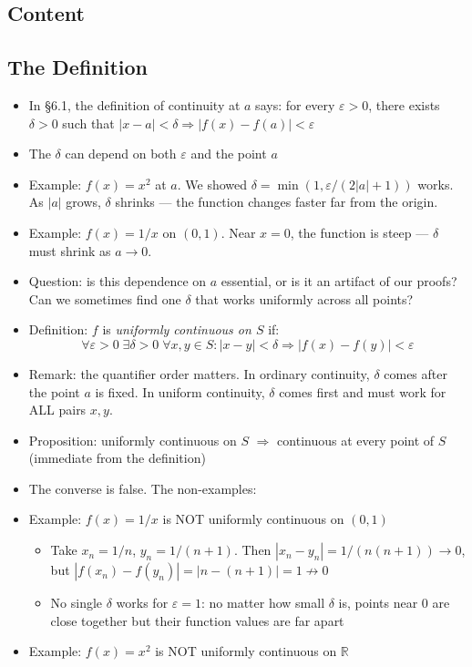 \documentclass[
  10pt,
  letterpaper,
]{scrbook}
\providecommand{\tightlist}{%
  \setlength{\itemsep}{0pt}\setlength{\parskip}{0pt}}
\newcommand{\RR}{\mathbb{R}}
\begin{document}
\subsection{Content}\label{content-28}

\subsection{The Definition}\label{the-definition-2}

\begin{itemize}
\tightlist
\item
  In §6.1, the definition of continuity at \(a\) says: for every
  \(\varepsilon > 0\), there exists \(\delta > 0\) such that
  \(|x - a| < \delta \Rightarrow |f(x) - f(a)| < \varepsilon\)
\item
  The \(\delta\) can depend on both \(\varepsilon\) and the point \(a\)
\item
  Example: \(f(x) = x^2\) at \(a\). We showed
  \(\delta = \min(1, \varepsilon/(2|a|+1))\) works. As \(|a|\) grows,
  \(\delta\) shrinks --- the function changes faster far from the
  origin.
\item
  Example: \(f(x) = 1/x\) on \((0,1)\). Near \(x = 0\), the function is
  steep --- \(\delta\) must shrink as \(a \to 0\).
\item
  Question: is this dependence on \(a\) essential, or is it an artifact
  of our proofs? Can we sometimes find one \(\delta\) that works
  uniformly across all points?
\item
  Definition: \(f\) is \emph{uniformly continuous on \(S\)} if:
  \[\forall \varepsilon > 0 \; \exists \delta > 0 \; \forall x, y \in S: |x - y| < \delta \Rightarrow |f(x) - f(y)| < \varepsilon\]
\item
  Remark: the quantifier order matters. In ordinary continuity,
  \(\delta\) comes after the point \(a\) is fixed. In uniform
  continuity, \(\delta\) comes first and must work for ALL pairs
  \(x, y\).
\item
  Proposition: uniformly continuous on \(S\) \(\Rightarrow\) continuous
  at every point of \(S\) (immediate from the definition)
\item
  The converse is false. The non-examples:
\item
  Example: \(f(x) = 1/x\) is NOT uniformly continuous on \((0,1)\)

  \begin{itemize}
  \tightlist
  \item
    Take \(x_n = 1/n\), \(y_n = 1/(n+1)\). Then
    \(|x_n - y_n| = 1/(n(n+1)) \to 0\), but
    \(|f(x_n) - f(y_n)| = |n - (n+1)| = 1 \not\to 0\)
  \item
    No single \(\delta\) works for \(\varepsilon = 1\): no matter how
    small \(\delta\) is, points near \(0\) are close together but their
    function values are far apart
  \end{itemize}
\item
  Example: \(f(x) = x^2\) is NOT uniformly continuous on \(\RR\)


\end{itemize}
\end{document}
